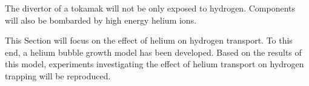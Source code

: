 The divertor of a tokamak will not be only exposed to hydrogen.
Components will also be bombarded by high energy helium ions.

This Section will focus on the effect of helium on hydrogen transport.
To this end, a helium bubble growth model has been developed.
Based on the results of this model, experiments investigating the effect of helium transport on hydrogen trapping will be reproduced.
